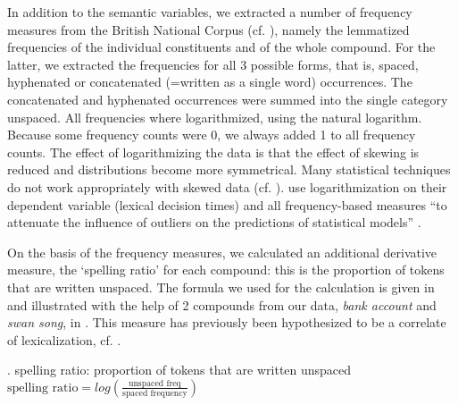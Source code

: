 In addition to the semantic variables, we extracted a number of frequency
measures from the British National Corpus (cf. \citealt{BNCxml}), namely the lemmatized
frequencies of the individual constituents and of the whole
compound. For the latter, we extracted the frequencies for all 3
possible forms, that is, spaced, hyphenated or concatenated (=written as a
single word) occurrences. The concatenated and hyphenated occurrences were
summed into the single category unspaced.  
All frequencies where logarithmized, using the natural logarithm.
Because
some frequency counts were 0, we always added 1 to all frequency
counts.
The effect of logarithmizing the
data is that the effect of skewing is reduced and distributions become
more symmetrical. Many statistical techniques do not
work appropriately with skewed data (cf. \citealt[31]{Baayen:2008a}).
\citet[954]{KupermanandBertram:2013} use logarithmization on their
dependent variable (lexical decision times) and all frequency-based
measures ``to attenuate
the influence of outliers on the predictions of statistical models'' \citep[954]{KupermanandBertram:2013}.

On the basis of the frequency measures, we calculated an additional
derivative measure, 
the `spelling ratio' for each compound: this is the proportion of
tokens that are written unspaced. The formula we used for the
calculation is given in \Next and illustrated with the help of 2
compounds from our data, \emph{bank account} and \emph{swan song}, in
\NNext. This measure has previously been hypothesized to be a
correlate of lexicalization, cf. \citet[496]{BellandPlag:2012}.

\ex. spelling ratio: proportion of tokens that are written unspaced\\[.5em]
\( \displaystyle \text{spelling ratio} =  log(\frac{\text{unspaced freq}}{\text{spaced frequency}}) \)

